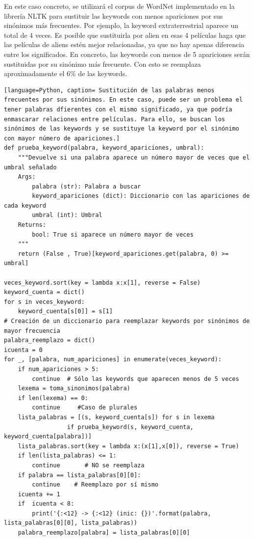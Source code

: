 En este caso concreto, se utilizará el corpus de WordNet \cite{WordNet} implementado en la librería NLTK para sustituir las keywords con menos apariciones por sus sinónimos más frecuentes. Por ejemplo, la keyword extraterrestrial aparece un total de 4 veces. Es posible que sustituirla por alien en esas 4 películas haga que las películas de aliens estén mejor relacionadas, ya que no hay apenas diferencia entre los significados. En concreto, las keywords con menos de 5 apariciones serán sustituidas por su sinónimo más frecuente. Con esto se reemplaza aproximadamente el $6 \%$ de las keywords.
\begin{lstlisting}[language=Python, caption= Sustitución de las palabras menos frecuentes por sus sinónimos. En este caso, puede ser un problema el tener palabras dfierentes con el mismo significado, ya que podría enmascarar relaciones entre películas. Para ello, se buscan los sinónimos de las keywords y se sustituye la keyword por el sinónimo con mayor número de apariciones.]
def prueba_keyword(palabra, keyword_apariciones, umbral):
    """Devuelve si una palabra aparece un número mayor de veces que el umbral señalado
    Args:
        palabra (str): Palabra a buscar
        keyword_apariciones (dict): Diccionario con las apariciones de cada keyword
        umbral (int): Umbral
    Returns:
        bool: True si aparece un número mayor de veces
    """
    return (False , True)[keyword_apariciones.get(palabra, 0) >= umbral] 

veces_keyword.sort(key = lambda x:x[1], reverse = False)
keyword_cuenta = dict()
for s in veces_keyword:
    keyword_cuenta[s[0]] = s[1]
# Creación de un diccionario para reemplazar keywords por sinónimos de mayor frecuencia
palabra_reemplazo = dict()
icuenta = 0
for _, [palabra, num_apariciones] in enumerate(veces_keyword):
    if num_apariciones > 5:
        continue  # Sólo las keywords que aparecen menos de 5 veces
    lexema = toma_sinonimos(palabra)
    if len(lexema) == 0:
        continue     #Caso de plurales
    lista_palabras = [(s, keyword_cuenta[s]) for s in lexema 
                  if prueba_keyword(s, keyword_cuenta, keyword_cuenta[palabra])]
    lista_palabras.sort(key = lambda x:(x[1],x[0]), reverse = True)    
    if len(lista_palabras) <= 1:
        continue       # NO se reemplaza
    if palabra == lista_palabras[0][0]:
        continue    # Reemplazo por sí mismo
    icuenta += 1
    if  icuenta < 8:
        print('{:<12} -> {:<12} (inic: {})'.format(palabra, lista_palabras[0][0], lista_palabras))
    palabra_reemplazo[palabra] = lista_palabras[0][0]
\end{lstlisting}

